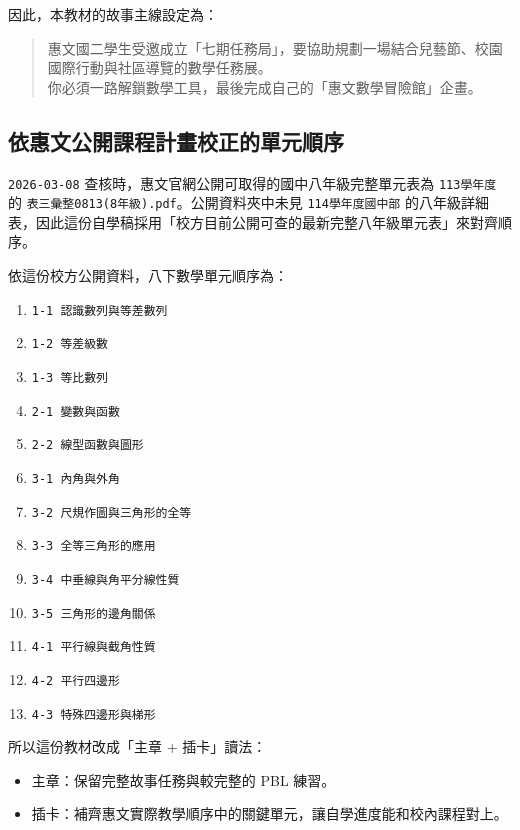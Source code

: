 \documentclass[
  chinese,
  12pt,
  a4paper,
  oneside]{article}
\providecommand{\tightlist}{%
  \setlength{\itemsep}{0pt}\setlength{\parskip}{0pt}}
\begin{document}
因此，本教材的故事主線設定為：

\begin{quote}
惠文國二學生受邀成立「七期任務局」，要協助規劃一場結合兒藝節、校園國際行動與社區導覽的數學任務展。\\
你必須一路解鎖數學工具，最後完成自己的「惠文數學冒險館」企畫。
\end{quote}

\subsection{依惠文公開課程計畫校正的單元順序}\label{ux4f9dux60e0ux6587ux516cux958bux8ab2ux7a0bux8a08ux756bux6821ux6b63ux7684ux55aeux5143ux9806ux5e8f}

\texttt{2026-03-08} 查核時，惠文官網公開可取得的國中八年級完整單元表為
\texttt{113學年度} 的 \texttt{表三彙整0813(8年級).pdf}。公開資料夾中未見
\texttt{114學年度國中部}
的八年級詳細表，因此這份自學稿採用「校方目前公開可查的最新完整八年級單元表」來對齊順序。

依這份校方公開資料，八下數學單元順序為：

\begin{enumerate}
\def\labelenumi{\arabic{enumi}.}
\tightlist
\item
  \texttt{1-1\ 認識數列與等差數列}
\item
  \texttt{1-2\ 等差級數}
\item
  \texttt{1-3\ 等比數列}
\item
  \texttt{2-1\ 變數與函數}
\item
  \texttt{2-2\ 線型函數與圖形}
\item
  \texttt{3-1\ 內角與外角}
\item
  \texttt{3-2\ 尺規作圖與三角形的全等}
\item
  \texttt{3-3\ 全等三角形的應用}
\item
  \texttt{3-4\ 中垂線與角平分線性質}
\item
  \texttt{3-5\ 三角形的邊角關係}
\item
  \texttt{4-1\ 平行線與截角性質}
\item
  \texttt{4-2\ 平行四邊形}
\item
  \texttt{4-3\ 特殊四邊形與梯形}
\end{enumerate}

所以這份教材改成「主章 + 插卡」讀法：

\begin{itemize}
\tightlist
\item
  主章：保留完整故事任務與較完整的 PBL 練習。
\item
  插卡：補齊惠文實際教學順序中的關鍵單元，讓自學進度能和校內課程對上。
\end{itemize}
\end{document}

